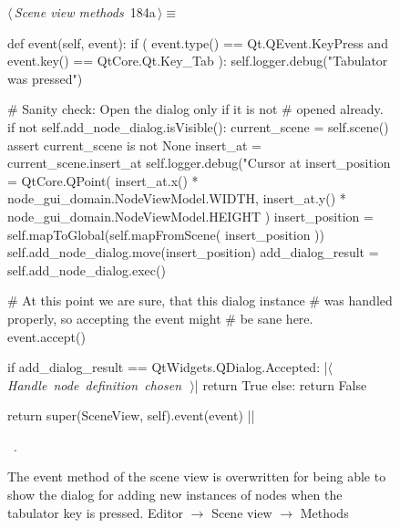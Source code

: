 \documentclass[%
    a4paper,    %
    justified,  %
    nobib,      %
    openany     %
]{tufte-book}
\makeatletter
\renewcommand{\label}[1]{\@tufte@label{##1}}%
\makeatother
\begin{document}
\begin{figure}[!htbp]
\begin{flushleft} \small
\begin{minipage}{\linewidth}\label{scrap157}\raggedright\small
{} $\langle\,${\itshape Scene view methods}\nobreak\ {\footnotesize {184a}}$\,\rangle\equiv$
\vspace{-1ex}
\begin{pythoncode}
def event(self, event):
    if (
            event.type() == Qt.QEvent.KeyPress and
            event.key()  == QtCore.Qt.Key_Tab
    ):
        self.logger.debug("Tabulator was pressed")

        # Sanity check: Open the dialog only if it is not
        # opened already.
        if not self.add_node_dialog.isVisible():
            current_scene = self.scene()
            assert current_scene is not None
            insert_at = current_scene.insert_at
            self.logger.debug("Cursor at %
            insert_position = QtCore.QPoint(
                insert_at.x() * node_gui_domain.NodeViewModel.WIDTH,
                insert_at.y() * node_gui_domain.NodeViewModel.HEIGHT
            )
            insert_position = self.mapToGlobal(self.mapFromScene(
                insert_position
            ))
            self.add_node_dialog.move(insert_position)
            add_dialog_result = self.add_node_dialog.exec()

            # At this point we are sure, that this dialog instance
            # was handled properly, so accepting the event might
            # be sane here.
            event.accept()

            if add_dialog_result == QtWidgets.QDialog.Accepted:
                |\hbox{$\langle\,${\itshape Handle node definition chosen}\nobreak\ {\footnotesize {}}$\,\rangle$}|
                return True
            else:
                return False

    return super(SceneView, self).event(event)
|\NWsep|
\end{pythoncode}
\vspace{1.5ex}
\footnotesize
\begin{list}{}{\setlength{\itemsep}{-\parsep}\setlength{\itemindent}{-\leftmargin}}
\item \NWtxtMacroRefIn\ .

\item{}
\end{list}
\end{minipage}\vspace{4ex}
\end{flushleft}
\vspace*{-20mm}\caption{The event method of the scene view is
    overwritten for being able to show the dialog for adding new
    instances of nodes when the tabulator key is pressed.
  \newline{}\newline{}Editor $\rightarrow$ Scene view $\rightarrow$ Methods}
\end{figure}
\end{document}
